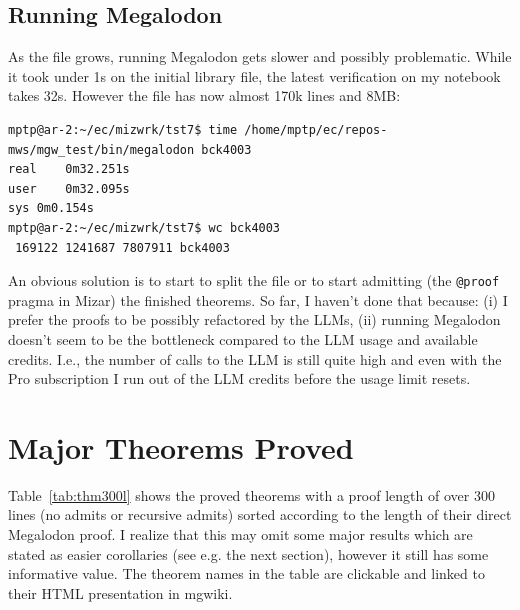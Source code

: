 \documentclass[a4paper,UKenglish,cleveref, autoref, thm-restate]{lipics-v2021}
\begin{document}
\subsection{Running Megalodon}

As the file grows, running Megalodon gets slower and possibly problematic. While it took under 1s on the initial library file, the latest verification on my notebook takes 32s. However the file has  now almost 170k lines and 8MB:
\begin{small}
\begin{verbatim}
mptp@ar-2:~/ec/mizwrk/tst7$ time /home/mptp/ec/repos-mws/mgw_test/bin/megalodon bck4003
real	0m32.251s
user	0m32.095s
sys	0m0.154s
mptp@ar-2:~/ec/mizwrk/tst7$ wc bck4003 
 169122 1241687 7807911 bck4003
\end{verbatim}
\end{small}
An obvious solution is to start to split the file or to start admitting (the
\texttt{@proof} pragma in Mizar) the finished theorems. So far, I haven't done
that because: (i) I prefer the proofs to be possibly refactored by the LLMs,
(ii) running Megalodon doesn't seem to be the bottleneck compared to the LLM
usage and available credits. I.e., the number of calls to the LLM is still quite
high and even with the Pro subscription I run out of the LLM credits before the
usage limit resets.


\section{Major Theorems Proved}
Table~\ref{tab:thm300l} shows the proved theorems with a proof length of over 300 lines (no admits or recursive admits)
sorted according to the length of their direct Megalodon proof. I realize that this
may omit some major results which are stated as easier corollaries (see e.g. the
next section), however it still has some informative value. The theorem names in
the table are clickable and linked to their HTML presentation in mgwiki.

%

%

%

%
\newcommand{\mgw}[1]{\href{https://mgwiki.github.io/mgw_test/topology.mg.html\##1}{\texttt{\detokenize{#1}}}}
\end{document}
